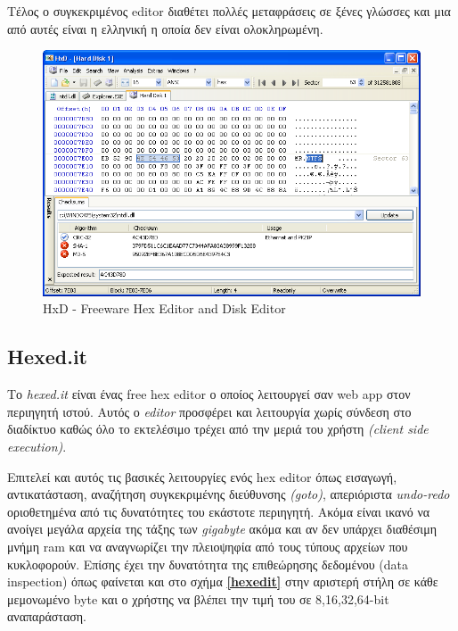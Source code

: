 Τέλος ο συγκεκριμένος editor διαθέτει πολλές μεταφράσεις σε ξένες γλώσσες και μια από αυτές είναι η ελληνική η οποία δεν είναι ολοκληρωμένη.

\begin{figure}[ht]
\centering
\includegraphics[scale=0.5]{static/hxd.png}
\caption{HxD - Freeware Hex Editor and Disk Editor}
\label{hxd}
\end{figure}

\pagebreak
\subsection{Hexed.it}
Το \emph{hexed.it}\cite{hexedit} είναι ένας free hex editor ο οποίος λειτουργεί σαν web app στον περιηγητή ιστού.
Αυτός ο \emph{editor} προσφέρει και λειτουργία χωρίς σύνδεση στο διαδίκτυο καθώς όλο το εκτελέσιμο τρέχει από την μεριά του χρήστη \emph{(client side execution)}.

Επιτελεί και αυτός τις βασικές λειτουργίες ενός hex editor όπως εισαγωγή, αντικατάσταση, αναζήτηση συγκεκριμένης διεύθυνσης \emph{(goto)}, απεριόριστα \emph{undo-redo} οριοθετημένα από τις δυνατότητες του εκάστοτε περιηγητή.
Ακόμα είναι ικανό να ανοίγει μεγάλα αρχεία της τάξης των \emph{gigabyte} ακόμα και αν δεν υπάρχει διαθέσιμη μνήμη ram και να αναγνωρίζει την πλειοψηφία από τους τύπους αρχείων που κυκλοφορούν.
Επίσης έχει την δυνατότητα της επιθεώρησης δεδομένου (data inspection) όπως φαίνεται και στο σχήμα \textbf{\ref{hexedit}} στην αριστερή στήλη σε κάθε μεμονωμένο byte και ο χρήστης να βλέπει την τιμή του σε 8,16,32,64-bit αναπαράσταση.

